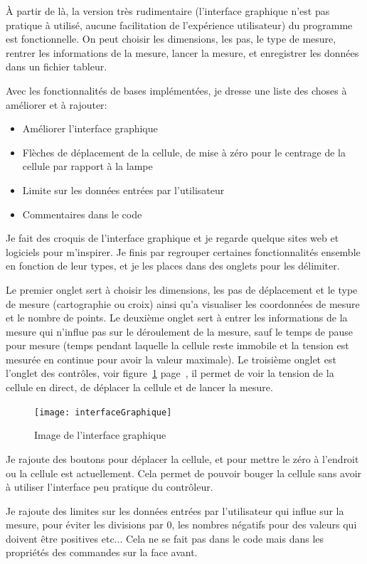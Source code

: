 \documentclass[12pt]{article}
\begin{document}
À partir de là, la version très rudimentaire (l'interface graphique n'est pas pratique à utilisé, aucune facilitation de l'expérience utilisateur) du programme est fonctionnelle.
On peut choisir les dimensions, les pas, le type de mesure, rentrer les informations de la mesure, lancer la mesure, et enregistrer les données dans un fichier tableur.

Avec les fonctionnalités de bases implémentées, je dresse une liste des choses à améliorer et à rajouter:
\begin{itemize}
	\item Améliorer l'interface graphique
	\item Flèches de déplacement de la cellule, de mise à zéro pour le centrage de la cellule par rapport à la lampe
	\item Limite sur les données entrées par l'utilisateur
	\item Commentaires dans le code
\end{itemize}
Je fait des croquis de l'interface graphique et je regarde quelque sites web et logiciels pour m'inspirer.
Je finis par regrouper certaines fonctionnalités ensemble en fonction de leur types, et je les places dans des onglets pour les délimiter.

Le premier onglet sert à choisir les dimensions, les pas de déplacement et le type de mesure (cartographie ou croix) ainsi qu'a visualiser les coordonnées de mesure et le nombre de points.
Le deuxième onglet sert à entrer les informations de la mesure qui n'influe pas sur le déroulement de la mesure, sauf le temps de pause pour mesure (temps pendant laquelle la cellule reste immobile et la tension est mesurée en continue pour avoir la valeur maximale).
Le troisième onglet est l'onglet des contrôles, voir figure~\ref{fig:interfaceGraphique} page~\pageref{fig:interfaceGraphique}, il permet de voir la tension de la cellule en direct, de déplacer la cellule et de lancer la mesure.

\begin{figure}[h]
	\centering
	\texttt{[image: interfaceGraphique]}
	\caption{Image de l'interface graphique}
	\label{fig:interfaceGraphique}
\end{figure}

Je rajoute des boutons pour déplacer la cellule, et pour mettre le zéro à l'endroit ou la cellule est actuellement.
Cela permet de pouvoir bouger la cellule sans avoir à utiliser l'interface peu pratique du contrôleur.

Je rajoute des limites sur les données entrées par l'utilisateur qui influe sur la mesure, pour éviter les divisions par 0, les nombres négatifs pour des valeurs qui doivent être positives etc... Cela ne se fait pas dans le code mais dans les propriétés des commandes sur la face avant.
\end{document}
